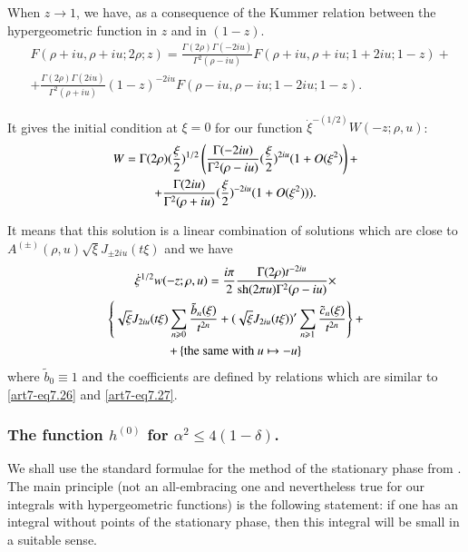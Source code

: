 When $z \to 1$, we have, as a consequence of the Kummer relation between the hypergeometric function in $z$ and in $(1-z)$.
\begin{equation}
\begin{split}
& F(\rho + iu, \rho + iu; 2 \rho ; z) = \frac{\Gamma (2 \rho) \Gamma (-2 iu)}{\Gamma^2 (\rho - iu)} F (\rho + iu, \rho + iu; 1+ 2 iu ; 1-z) +\\
& + \frac{\Gamma (2\rho) \Gamma (2 iu)}{\Gamma^2 (\rho + iu)} (1-z)^{-2iu} F (\rho - iu, \rho - iu; 1-2 iu ; 1-z). 
\end{split}
\label{art7-eq7.33}
\end{equation}\pageoriginale 

It gives the initial condition at $\xi = 0$ for our function $\dot{\xi}^{-(1/2)} W (-z ; \rho , u)$:
\begin{gather}
W = \Gamma (2 \rho) (\frac{\xi}{2})^{1/2}  \left(\frac{\Gamma (-2 iu)}{\Gamma^2(\rho - iu)} (\frac{\xi}{2})^{2iu} (1+O(\xi^2) \right) +\label{art7-eq7.34}\\
+ \frac{\Gamma (2 i u)}{\Gamma^2 (\rho + iu)} (\frac{\xi}{2})^{-2 iu} (1+ O (\xi^2))). \notag
\end{gather}

It means that this solution is a linear combination of solutions which are close to $A^{(\pm)} (\rho, u) \sqrt{\xi} J_{\pm 2 iu } (t \xi)$ and we have
\begin{gather}
\dot{\xi}^{1/2} w (-z; \rho,u) = \frac{i\pi}{2} \frac{\Gamma (2 \rho) t^{-2 i u}}{\text{sh} (2 \pi u) \Gamma^2 (\rho - iu)} \times \label{art7-eq7.35}\\
\left\{\sqrt{\xi} J_{2 i u} (t \xi) \sum\limits_{n \geqslant 0} \frac{\tilde{b}_n (\xi)}{t^{2n}} + (\sqrt{\xi} J_{ 2i u} (t \xi))' \sum\limits_{n \geqslant 1} \frac{\tilde{c}_n (\xi)}{t^{2n}}\right\}  + \notag\\
+ \left\{\text{the same with } u \mapsto - u \right\}\notag
\end{gather}
where $\tilde{b}_0 \equiv 1$ and the coefficients are defined by relations which are similar to \eqref{art7-eq7.26} and \eqref{art7-eq7.27}.

\setcounter{section}{2}
\subsubsection{The function $h^{(0)}$ for $\alpha^2 \leqslant 4 (1-\delta)$.}\label{art7-subsubsec2.6.6}
We shall use the standard formulae for the method of the stationary phase from \cite{art7-key6}. The main principle (not an all-embracing one and nevertheless true for our integrals with hypergeometric functions) is the following statement: if one has an integral without points of the stationary phase, then this integral will be small in a suitable sense. 

